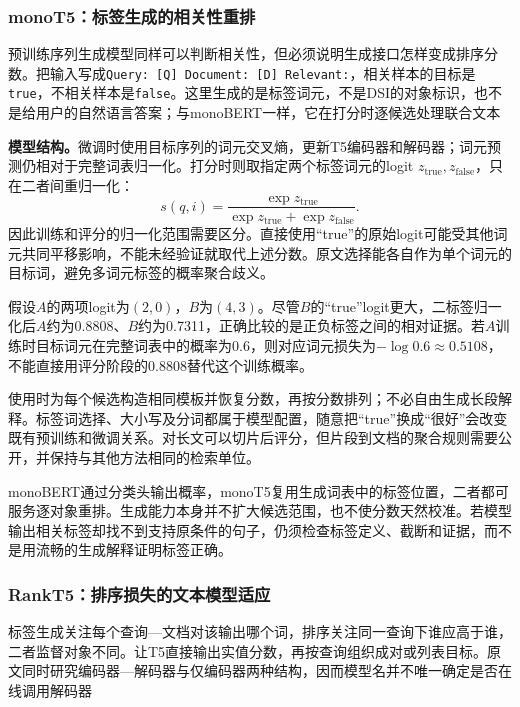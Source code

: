 \Needspace{100mm}
\subsubsection{monoT5：标签生成的相关性重排}
\label{sec:rs-search-monot5}

预训练序列生成模型同样可以判断相关性，但必须说明生成接口怎样变成排序分数。把输入写成\texttt{Query: [Q] Document: [D] Relevant:}，相关样本的目标是\texttt{true}，不相关样本是\texttt{false}。这里生成的是标签词元，不是DSI的对象标识，也不是给用户的自然语言答案；与monoBERT一样，它在打分时逐候选处理联合文本

\textbf{模型结构。}微调时使用目标序列的词元交叉熵，更新T5编码器和解码器；词元预测仍相对于完整词表归一化。打分时则取指定两个标签词元的logit $z_{\mathrm{true}},z_{\mathrm{false}}$，只在二者间重归一化：
\begin{equation}
 s(q,i)=\frac{\exp z_{\mathrm{true}}}
 {\exp z_{\mathrm{true}}+\exp z_{\mathrm{false}}}.
 \label{eq:rs-search-monot5}
\end{equation}
因此训练和评分的归一化范围需要区分。直接使用“true”的原始logit可能受其他词元共同平移影响，不能未经验证就取代上述分数。原文选择能各自作为单个词元的目标词，避免多词元标签的概率聚合歧义。

假设$A$的两项logit为$(2,0)$，$B$为$(4,3)$。尽管$B$的“true”logit更大，二标签归一化后$A$约为0.8808、$B$约为0.7311，正确比较的是正负标签之间的相对证据。若$A$训练时目标词元在完整词表中的概率为0.6，则对应词元损失为$-\log0.6\approx0.5108$，不能直接用评分阶段的0.8808替代这个训练概率。

使用时为每个候选构造相同模板并恢复分数，再按分数排列；不必自由生成长段解释。标签词选择、大小写及分词都属于模型配置，随意把“true”换成“很好”会改变既有预训练和微调关系。对长文可以切片后评分，但片段到文档的聚合规则需要公开，并保持与其他方法相同的检索单位。

monoBERT通过分类头输出概率，monoT5复用生成词表中的标签位置，二者都可服务逐对象重排。生成能力本身并不扩大候选范围，也不使分数天然校准。若模型输出相关标签却找不到支持原条件的句子，仍须检查标签定义、截断和证据，而不是用流畅的生成解释证明标签正确。

\Needspace{100mm}
\subsubsection{RankT5：排序损失的文本模型适应}
\label{sec:rs-search-rankt5}

标签生成关注每个查询—文档对该输出哪个词，排序关注同一查询下谁应高于谁，二者监督对象不同。让T5直接输出实值分数，再按查询组织成对或列表目标。原文同时研究编码器—解码器与仅编码器两种结构，因而模型名并不唯一确定是否在线调用解码器

